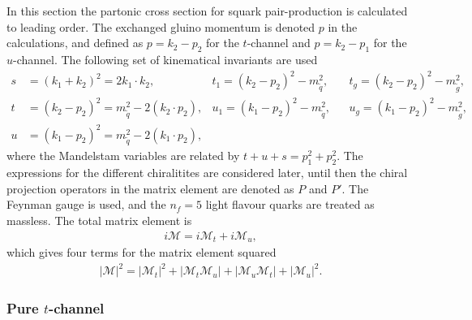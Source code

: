 \documentclass[twoside,english]{uiofysmaster}
\begin{document}
{In this section the partonic cross section for squark pair-production is calculated to leading order. The exchanged gluino momentum is denoted $p$ in the calculations, and defined as $p= k_2-p_2 $ for the $t$-channel and $p=k_2-p_1$ for the $u$-channel. The following set of kinematical invariants are used
\begin{align*}
s &= (k_1 + k_2)^2 = 2 k_1 \cdot k_2, &t_1 = (k_2-p_2)^2 - m_{\widetilde{q}}^2, &&t_g = (k_2-p_2)^2 - m_{\widetilde{g}}^2,\\
t &= (k_2-p_2)^2 = m_{\widetilde{q}}^2 - 2 (k_2 \cdot p_2), &u_1 = (k_1-p_2)^2 - m_{\widetilde{q}}^2, &&u_g = (k_1-p_2)^2 - m_{\widetilde{g}}^2,\\
u &= (k_1 - p_2)^2 = m_{\widetilde{q}}^2 - 2 (k_1 \cdot p_2),
\end{align*}
where the Mandelstam variables are related by $t + u+ s = p_1^2 + p_2^2$. The expressions for the different chiralitites are considered later, until then the chiral projection operators in the matrix element are denoted as $P$ and $P'$. The Feynman gauge is used, and the $n_f = 5$ light flavour quarks are treated as massless. The total matrix element is
\begin{align}\label{Eq:: susy hadron : matrix element}
i\mathcal{M} = i\mathcal{M}_t + i\mathcal{M}_u,
\end{align}
which gives four terms for the matrix element squared
\begin{align}\label{Eq:: susy hadron : matrix element squared}
|\mathcal{M}|^2 = |\mathcal{M}_t|^2 + |\mathcal{M}_t \mathcal{M}_u| + |\mathcal{M}_u \mathcal{M}_t| + |\mathcal{M}_u|^2.
\end{align}

\subsubsection{Pure $t$-channel}

}
\end{document}
